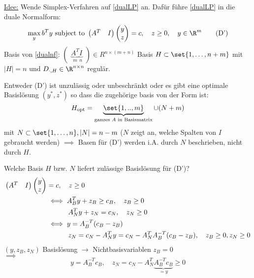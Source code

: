 \underline{Idee:} Wende Simplex-Verfahren auf \eqref{dualLP} an.
Dafür führe \eqref{dualLP} in die duale Normalform:
\begin{equation}\label{dualnf}
	\max_{y} b^{T} y \text{ subject to }
	\begin{pmatrix}
		A^{T} & I
	\end{pmatrix}
	\begin{pmatrix}
	y\\z
	\end{pmatrix}
	= c, \quad z \geq 0, \quad y \in \R^m \tag{D'}
\end{equation}
Basis von \eqref{dualnf}: $
\begin{pmatrix}
	\underbrace{A^{T}}_{m} \underbrace{I}_{n}
\end{pmatrix}
\in R^{n \times(m +n)}$
Basis $H \subset \set{1,\dots ,n+m }$ mit $|H|=n$ und $D_{\cdot,H}\in \R^{n \times n}$ regulär.
\begin{theorem}
	Entweder (D') ist unzulässig oder unbeschränkt oder es gibt eine optimale Basislösung $(y^*,z^*)$ so dass die zugehörige basis von der Form ist:
	\begin{equation*}
		H_{\text{opt}}=\underbrace{ \set{1,..,m }}_{\text{ganzes $A$ in Basismatrix}}\cup (N+m)
	\end{equation*}
	mit $N \subset \set{1,\dots ,n }, |N|= n-m$ ($N$ zeigt an, welche Spalten von $I$ gebraucht werden)
	$\implies$ Basen für (D') werden i.A. durch $N$ beschrieben, nicht durch $H$.
\end{theorem}
Welche Basis $H$ bzw. $N$ liefert zulässige Basislösung für (D')?
\begin{align*}
	\begin{pmatrix}
		A^{T}  & I
	\end{pmatrix}
	\begin{pmatrix}
	y\\z
	\end{pmatrix}
	&=c, \quad z \geq 0\\
	&{}\iff A_{B}^{T} y + z_{B} \geq c_{B}, \quad z_{B} \geq 0\\
	&{}\hspace{1.1cm} A_{N}^{T} y + z_{N} = c_{N}, \quad z_{N} \geq 0 \\
	&{}\iff y = A_{B}^{-T}(c_{B}-z_{B})\\
	&{}\hspace{1.1cm} z_{N}= c_{N} - A_{N}^{T}y = c_{N}-A_{N}^{T} A_{B}^{-T}(c_{B}-z_{B}) ,\quad z_{B}\geq 0 ,z_{N} \geq 0
\end{align*}
$(y,z_{B},z_{N})$ Basislösung $\to$ Nichtbasisvariablen $z_{B} =0$ \\
$\implies$
\begin{equation*}
	y = A_{B}^{-T}c_{B}, \quad z_{N}= c_{N}- A_{N}^{T} \underbrace{A_{B}^{-T}c_{B}}_{{=y}}\geq 0
\end{equation*}
